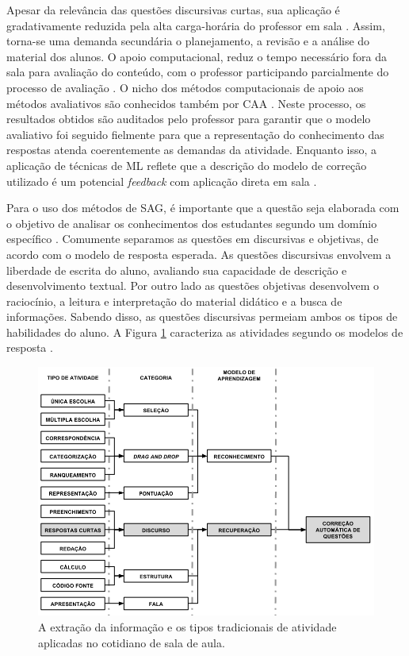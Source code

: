 Apesar da relevância das questões discursivas curtas, sua aplicação é gradativamente reduzida pela alta carga-horária do professor em sala \cite{bilgin2017}. Assim, torna-se uma demanda secundária o planejamento, a revisão e a análise do material dos alunos. O apoio computacional, reduz o tempo necessário fora da sala para avaliação do conteúdo, com o professor participando parcialmente do processo de avaliação \cite{ming2005}. O nicho dos métodos computacionais de apoio aos métodos avaliativos são conhecidos também por CAA \cite{perez-marin2009}. Neste processo, os resultados obtidos são auditados pelo professor para garantir que o modelo avaliativo foi seguido fielmente para que a representação do conhecimento das respostas atenda coerentemente as demandas da atividade. Enquanto isso, a aplicação de técnicas de ML reflete que a descrição do modelo de correção utilizado é um potencial \textit{feedback} com aplicação direta em sala \cite{butcher2010}.

Para o uso dos métodos de SAG, é importante que a questão seja elaborada com o objetivo de analisar os conhecimentos dos estudantes segundo um domínio específico \cite{bailey2008}. Comumente separamos as questões em discursivas e objetivas, de acordo com o modelo de resposta esperada. As questões discursivas \cite{bezerra2008} envolvem a liberdade de escrita do aluno, avaliando sua capacidade de descrição e desenvolvimento textual. Por outro lado as questões objetivas desenvolvem o raciocínio, a leitura e interpretação do material didático e a busca de informações. Sabendo disso, as questões discursivas permeiam ambos os tipos de habilidades do aluno. A Figura \ref{fig-atividades} caracteriza as atividades segundo os modelos de resposta \cite{burrows2015}.

\begin{figure}[h]
\includegraphics[width=\textwidth]{figuras/tiposAtividade}
\caption{A extração da informação e os tipos tradicionais de atividade aplicadas no cotidiano de sala de aula.}
\label{fig-atividades}
\end{figure}



